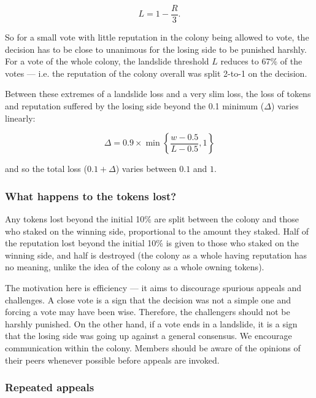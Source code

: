 \begin{equation}
L = 1 - \frac{R}{3}.
\end{equation}

So for a small vote with little reputation in the colony being allowed to vote, the decision has to be close to unanimous for the losing side to be punished harshly. For a vote of the whole colony, the landslide threshold $L$ reduces to 67\% of the votes --- i.e. the reputation of the colony overall was split 2-to-1 on the decision.

Between these extremes of a landslide loss and a very slim loss, the loss of tokens and reputation suffered by the losing side beyond the 0.1 minimum ($\Delta$) varies linearly:

\begin{equation}
 \Delta = 0.9 \times \min \left\lbrace \frac{w-0.5}{L-0.5}, 1 \right\rbrace
\end{equation}

\noindent and so the total loss ($0.1 + \Delta$) varies between $0.1$ and $1$.

\subsubsection*{What happens to the tokens lost?}

Any tokens lost beyond the initial 10\% are split between the colony and those who staked on the winning side, proportional to the amount they staked. Half of the reputation lost beyond the initial 10\% is given to those who staked on the winning side, and half is destroyed (the colony as a whole having reputation has no meaning, unlike the idea of the colony as a whole owning tokens).

The motivation here is efficiency --- it aims to discourage spurious appeals and challenges. A close vote is a sign that the decision was not a simple one and forcing a vote may have been wise. Therefore, the challengers should not be harshly punished. On the other hand, if a vote ends in a landslide, it is a sign that the losing side was going up against a general consensus. We encourage communication within the colony. Members should be aware of the opinions of their peers whenever possible before appeals are invoked.

\subsubsection*{Repeated appeals}

